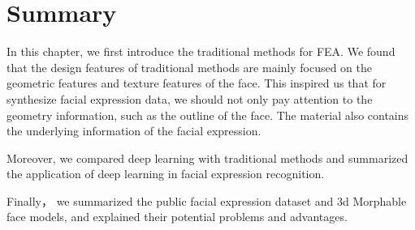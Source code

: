 \section{Summary}
In this chapter, we first introduce the traditional methods for FEA. We found that the design features of traditional methods are mainly focused on the geometric features and texture features of the face. This inspired us that for synthesize facial expression data, we should not only pay attention to the geometry information, such as the outline of the face. The material also contains the underlying information of the facial expression.

Moreover, we compared deep learning with traditional methods and summarized the application of deep learning in facial expression recognition. 

Finally， we summarized the public facial expression dataset and 3d Morphable face models, and explained their potential problems and advantages.




